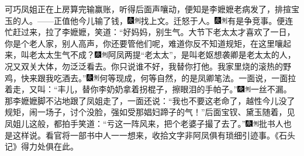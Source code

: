 可巧凤姐正在上房算完输赢账，听得后面声嚷动，便知是李嬷嬷老病发了，排揎宝玉的人。------正值他今儿输了钱，{\includegraphics[width=3mm]{../Images/00004}\includegraphics[width=3mm]{../Images/00011}\footnotesize \kaishu 找上文。}迁怒于人。{\includegraphics[width=3mm]{../Images/00004}\includegraphics[width=3mm]{../Images/00011}\footnotesize \kaishu 有是争竞事。}便连忙赶过来，拉了李嬷嬷，笑道：“好妈妈，别生气。大节下老太太才喜欢了一日，你是个老人家，别人高声，你还要管他们呢，难道你反不知道规矩，在这里嚷起来，叫老太太生气不成？{\includegraphics[width=3mm]{../Images/00004}\includegraphics[width=3mm]{../Images/00011}\footnotesize \kaishu 阿凤两提“老太太”，是叫老妪想袭卿是老太太的人，况又双关大体，勿泛泛看去。}你只说谁不好，我替你打他。我家里烧的滚热的野鸡，快来跟我吃酒去。”{\includegraphics[width=3mm]{../Images/00004}\includegraphics[width=3mm]{../Images/00011}\footnotesize \kaishu 何等现成，何等自然，的是凤卿笔法。}一面说，一面拉着走，又叫：“丰儿，替你李奶奶拿着拐棍子，擦眼泪的手帕子。”{\includegraphics[width=3mm]{../Images/00004}\includegraphics[width=3mm]{../Images/00011}\footnotesize \kaishu 一丝不漏。}那李嬷嬷脚不沾地跟了凤姐走了，一面还说：“我也不要这老命了，越性今儿没了规矩，闹一场子，讨个没脸，强如受那娼妇蹄子的气！”后面宝钗、黛玉随着，见凤姐儿这般，都拍手笑道：“亏这一阵风来，把个老婆子撮了去了。”{\includegraphics[width=3mm]{../Images/00004}\includegraphics[width=3mm]{../Images/00011}\footnotesize \kaishu 批书人也是这样说。看官将一部书中人一一想来，收拾文字非阿凤俱有琐细引迹事。《石头记》得力处俱在此。}

